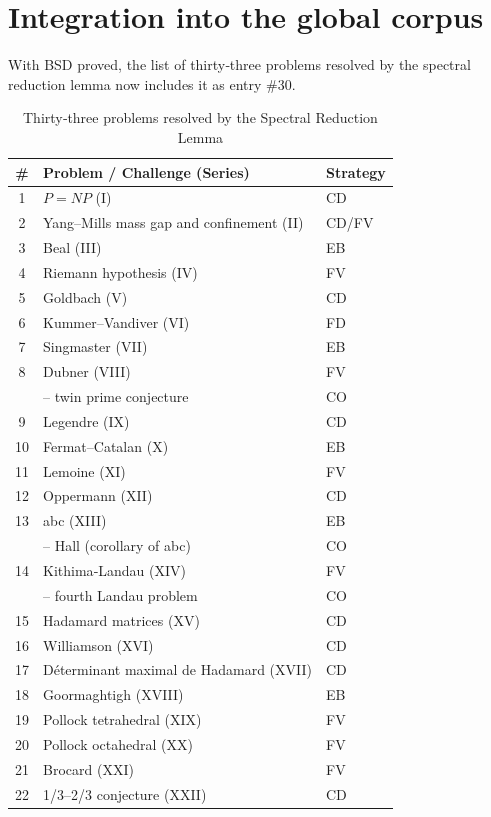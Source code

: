 \documentclass[11pt,a4paper]{article}
\begin{document}
\section{Integration into the global corpus}

With BSD proved, the list of thirty‑three problems resolved by the spectral reduction lemma now includes it as entry \#30.

\begin{center}
\small
\begin{longtable}{@{}cll@{}}
\caption{Thirty‑three problems resolved by the Spectral Reduction Lemma}\\
\toprule
\# & Problem / Challenge (Series) & Strategy \\
\midrule
1 & \(P = NP\) (I) & CD \\
2 & Yang–Mills mass gap and confinement (II) & CD/FV \\
3 & Beal (III) & EB \\
4 & Riemann hypothesis (IV) & FV \\
5 & Goldbach (V) & CD \\
6 & Kummer–Vandiver (VI) & FD \\
7 & Singmaster (VII) & EB \\
8 & Dubner (VIII) & FV \\
   & \quad – twin prime conjecture & CO \\
9 & Legendre (IX) & CD \\
10 & Fermat–Catalan (X) & EB \\
11 & Lemoine (XI) & FV \\
12 & Oppermann (XII) & CD \\
13 & abc (XIII) & EB \\
   & \quad – Hall (corollary of abc) & CO \\
14 & Kithima‑Landau (XIV) & FV \\
    & \quad – fourth Landau problem & CO \\
15 & Hadamard matrices (XV) & CD \\
16 & Williamson (XVI) & CD \\
17 & Déterminant maximal de Hadamard (XVII) & CD \\
18 & Goormaghtigh (XVIII) & EB \\
19 & Pollock tetrahedral (XIX) & FV \\
20 & Pollock octahedral (XX) & FV \\
21 & Brocard (XXI) & FV \\
22 & 1/3–2/3 conjecture (XXII) & CD \\

\end{longtable}
\end{center}
\end{document}
